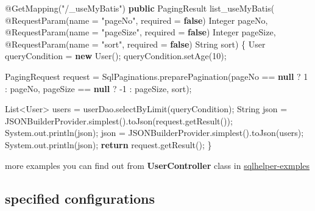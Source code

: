\documentclass[
]{book}
\newenvironment{Shaded}{\begin{snugshade}}{\end{snugshade}}
\newcommand{\AttributeTok}[1]{\textcolor[rgb]{0.77,0.63,0.00}{#1}}
\newcommand{\BuiltInTok}[1]{#1}
\newcommand{\DecValTok}[1]{\textcolor[rgb]{0.00,0.00,0.81}{#1}}
\newcommand{\FunctionTok}[1]{\textcolor[rgb]{0.00,0.00,0.00}{#1}}
\newcommand{\KeywordTok}[1]{\textcolor[rgb]{0.13,0.29,0.53}{\textbf{#1}}}
\newcommand{\NormalTok}[1]{#1}
\newcommand{\StringTok}[1]{\textcolor[rgb]{0.31,0.60,0.02}{#1}}
\begin{document}
\begin{Shaded}
\begin{Highlighting}[]
    \AttributeTok{@GetMapping}\NormalTok{(}\StringTok{"/_useMyBatis"}\NormalTok{)}
    \KeywordTok{public}\NormalTok{ PagingResult }\FunctionTok{list_useMyBatis}\NormalTok{(}
            \AttributeTok{@RequestParam}\NormalTok{(name = }\StringTok{"pageNo"}\NormalTok{, required = }\KeywordTok{false}\NormalTok{) }\BuiltInTok{Integer}\NormalTok{ pageNo,}
            \AttributeTok{@RequestParam}\NormalTok{(name = }\StringTok{"pageSize"}\NormalTok{, required = }\KeywordTok{false}\NormalTok{) }\BuiltInTok{Integer}\NormalTok{ pageSize,}
            \AttributeTok{@RequestParam}\NormalTok{(name = }\StringTok{"sort"}\NormalTok{, required = }\KeywordTok{false}\NormalTok{) }\BuiltInTok{String}\NormalTok{ sort) \{}
\NormalTok{        User queryCondition = }\KeywordTok{new} \FunctionTok{User}\NormalTok{();}
\NormalTok{        queryCondition.}\FunctionTok{setAge}\NormalTok{(}\DecValTok{10}\NormalTok{);}

\NormalTok{        PagingRequest request = SqlPaginations.}\FunctionTok{preparePagination}\NormalTok{(pageNo == }\KeywordTok{null}\NormalTok{ ? }\DecValTok{1}\NormalTok{ : pageNo, pageSize == }\KeywordTok{null}\NormalTok{ ? -}\DecValTok{1}\NormalTok{ : pageSize, sort);}

        \BuiltInTok{List}\NormalTok{<User> users = userDao.}\FunctionTok{selectByLimit}\NormalTok{(queryCondition);}
        \BuiltInTok{String}\NormalTok{ json = JSONBuilderProvider.}\FunctionTok{simplest}\NormalTok{().}\FunctionTok{toJson}\NormalTok{(request.}\FunctionTok{getResult}\NormalTok{());}
        \BuiltInTok{System}\NormalTok{.}\FunctionTok{out}\NormalTok{.}\FunctionTok{println}\NormalTok{(json);}
\NormalTok{        json = JSONBuilderProvider.}\FunctionTok{simplest}\NormalTok{().}\FunctionTok{toJson}\NormalTok{(users);}
        \BuiltInTok{System}\NormalTok{.}\FunctionTok{out}\NormalTok{.}\FunctionTok{println}\NormalTok{(json);}
        \KeywordTok{return}\NormalTok{ request.}\FunctionTok{getResult}\NormalTok{();}
\NormalTok{    \}}
\end{Highlighting}
\end{Shaded}

more examples you can find out from \textbf{UserController} class in \href{https://github.com/fangjinuo/sqlhelper/blob/master/sqlhelper-examples/src/main/java/com/jn/sqlhelper/examples/common/controller/UserController.java}{sqlhelper-exmples}

\hypertarget{sqlhelper_mybatis_configuration}{%
\subsection{specified configurations}\label{sqlhelper_mybatis_configuration}}
\end{document}
